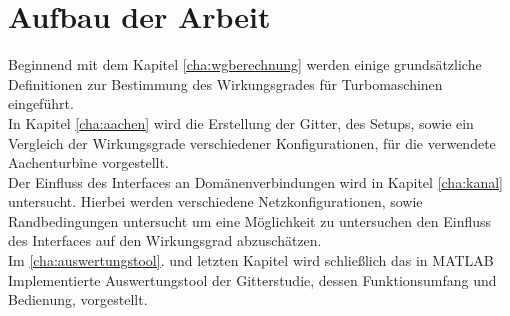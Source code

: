 \section*{Aufbau der Arbeit}
Beginnend mit dem Kapitel \ref{cha:wgberechnung} werden einige grundsätzliche Definitionen zur Bestimmung des Wirkungsgrades für Turbomaschinen eingeführt.\\
In Kapitel \ref{cha:aachen} wird die Erstellung der Gitter, des Setups, sowie ein Vergleich der Wirkungsgrade verschiedener Konfigurationen, für die verwendete Aachenturbine vorgestellt.\\
Der Einfluss des Interfaces an Domänenverbindungen wird in Kapitel \ref{cha:kanal} untersucht. Hierbei werden verschiedene Netzkonfigurationen, sowie Randbedingungen untersucht um eine Möglichkeit zu untersuchen den Einfluss des Interfaces auf den Wirkungsgrad abzuschätzen.\\
Im \ref{cha:auswertungstool}. und letzten Kapitel wird schließlich das in MATLAB Implementierte Auswertungstool der Gitterstudie, dessen Funktionsumfang und Bedienung, vorgestellt. 